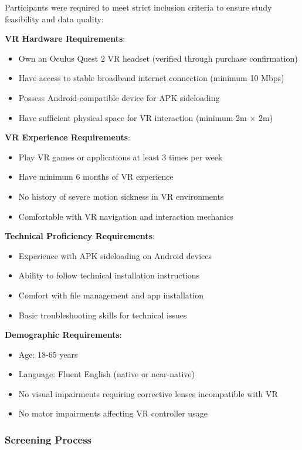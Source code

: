 \documentclass[12pt]{article}
\begin{document}
Participants were required to meet strict inclusion criteria to ensure study feasibility and data quality:

\textbf{VR Hardware Requirements}:
\begin{itemize}
    \item Own an Oculus Quest 2 VR headset (verified through purchase confirmation)
    \item Have access to stable broadband internet connection (minimum 10 Mbps)
    \item Possess Android-compatible device for APK sideloading
    \item Have sufficient physical space for VR interaction (minimum 2m × 2m)
\end{itemize}

\textbf{VR Experience Requirements}:
\begin{itemize}
    \item Play VR games or applications at least 3 times per week
    \item Have minimum 6 months of VR experience
    \item No history of severe motion sickness in VR environments
    \item Comfortable with VR navigation and interaction mechanics
\end{itemize}

\textbf{Technical Proficiency Requirements}:
\begin{itemize}
    \item Experience with APK sideloading on Android devices
    \item Ability to follow technical installation instructions
    \item Comfort with file management and app installation
    \item Basic troubleshooting skills for technical issues
\end{itemize}

\textbf{Demographic Requirements}:
\begin{itemize}
    \item Age: 18-65 years
    \item Language: Fluent English (native or near-native)
    \item No visual impairments requiring corrective lenses incompatible with VR
    \item No motor impairments affecting VR controller usage
\end{itemize}

\subsubsection{Screening Process}
\end{document}

